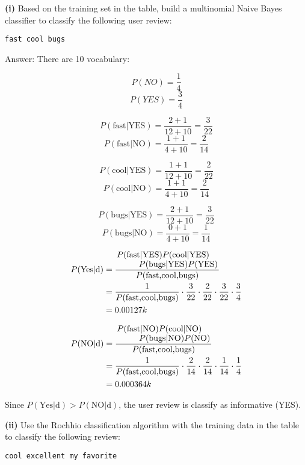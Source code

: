 \documentclass[11pt,a4paper]{report}
\begin{document}
\begin{multicols*}{2}
\noindent \textbf{(i)} Based on the training set in the table, build a multinomial Naive Bayes classifier to classify the following user review:
\begin{center}\verb|fast cool bugs|\end{center}

\noindent Answer: There are 10 vocabulary:

$$P(NO) = \frac{1}{4}$$
$$P(YES) = \frac{3}{4}$$

$$P(\text{fast}|\text{YES}) = \frac{2 + 1}{12 + 10} = \frac{3}{22}$$
$$P(\text{fast}|\text{NO}) = \frac{1 + 1}{4 + 10} = \frac{2}{14}$$

$$P(\text{cool}|\text{YES}) = \frac{1 + 1}{12 + 10} = \frac{2}{22}$$
$$P(\text{cool}|\text{NO}) = \frac{1 + 1}{4 + 10} = \frac{2}{14}$$

$$P(\text{bugs}|\text{YES}) = \frac{2 + 1}{12 + 10} = \frac{3}{22}$$
$$P(\text{bugs}|\text{NO}) = \frac{0 + 1}{4 + 10} = \frac{1}{14}$$

\begin{equation*}
\begin{split}
P(\text{Yes}|\text{d}) &= \frac{\splitfrac{P(\text{fast}|\text{YES})P(\text{cool}|\text{YES})}{P(\text{bugs}|\text{YES})P(\text{YES})}}{P(\text{fast,cool,bugs})}\\
&= \frac{1}{P(\text{fast,cool,bugs})} \cdot \frac{3}{22} \cdot \frac{2}{22} \cdot \frac{3}{22} \cdot \frac{3}{4}\\
&= 0.00127k
\end{split}
\end{equation*}

\begin{equation*}
\begin{split}
P(\text{NO}|\text{d}) &= \frac{\splitfrac{P(\text{fast}|\text{NO})P(\text{cool}|\text{NO})}{P(\text{bugs}|\text{NO})P(\text{NO})}}{P(\text{fast,cool,bugs})}\\
&= \frac{1}{P(\text{fast,cool,bugs})} \cdot \frac{2}{14} \cdot \frac{2}{14} \cdot \frac{1}{14} \cdot \frac{1}{4}\\
&= 0.000364k
\end{split}
\end{equation*}

\noindent Since $P(\text{Yes}|\text{d}) > P(\text{NO}|\text{d})$, the user review is classify as informative (YES). 

\noindent \textbf{(ii)} Use the Rochhio classification algorithm with the training data in the table to classify the following review:
\begin{center}\verb|cool excellent my favorite|\end{center}


\end{multicols*}
\end{document}
